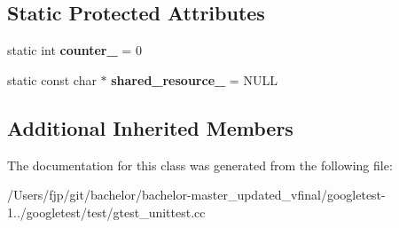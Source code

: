 \subsection*{Static Protected Attributes}
\begin{DoxyCompactItemize}
\item 
\mbox{\label{classtesting_1_1_set_up_test_case_test_a5b6e811128d35389be49f6569bf93817}} 
static int {\bfseries counter\+\_\+} = 0
\item 
\mbox{\label{classtesting_1_1_set_up_test_case_test_a904e77fd9a628b6a9aca0280665fd040}} 
static const char $\ast$ {\bfseries shared\+\_\+resource\+\_\+} = N\+U\+LL
\end{DoxyCompactItemize}
\subsection*{Additional Inherited Members}


The documentation for this class was generated from the following file\+:\begin{DoxyCompactItemize}
\item 
/\+Users/fjp/git/bachelor/bachelor-\/master\+\_\+updated\+\_\+vfinal/googletest-\/1../googletest/test/gtest\+\_\+unittest.\+cc\end{DoxyCompactItemize}
